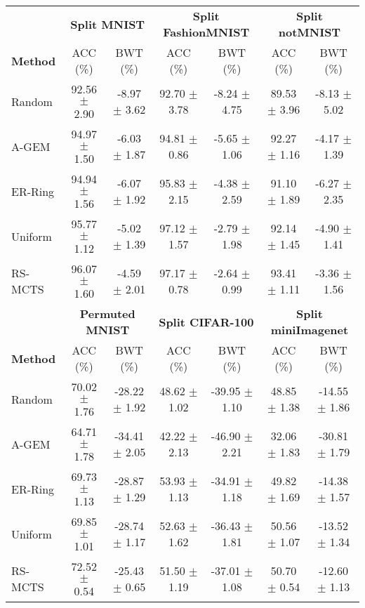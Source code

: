 \begin{tabular}{lcccccc}
	\toprule
	& \multicolumn{2}{c}{\textbf{Split MNIST}} & \multicolumn{2}{c}{\textbf{Split FashionMNIST}} & \multicolumn{2}{c}{\textbf{Split notMNIST}} \\ 
	\cmidrule(lr){2-3} \cmidrule(lr){4-5} \cmidrule(lr){6-7} 
	\textbf{Method} & ACC (\%)            & BWT (\%)           & ACC (\%)               & BWT (\%)               & ACC (\%)             & BWT (\%)             \\ \midrule
	Random          & 92.56 $\pm$ 2.90      & -8.97 $\pm$ 3.62     & 92.70 $\pm$ 3.78         & -8.24 $\pm$ 4.75         & 89.53 $\pm$ 3.96       & -8.13 $\pm$ 5.02       \\
	A-GEM           & 94.97 $\pm$ 1.50      & -6.03 $\pm$ 1.87     & 94.81 $\pm$ 0.86         & -5.65 $\pm$ 1.06         & 92.27 $\pm$ 1.16       & -4.17 $\pm$ 1.39       \\
	ER-Ring         & 94.94 $\pm$ 1.56      & -6.07 $\pm$ 1.92     & 95.83 $\pm$ 2.15         & -4.38 $\pm$ 2.59         & 91.10 $\pm$ 1.89       & -6.27 $\pm$ 2.35       \\
	Uniform      & 95.77 $\pm$ 1.12      & -5.02 $\pm$ 1.39     & 97.12 $\pm$ 1.57         & -2.79 $\pm$ 1.98         & 92.14 $\pm$ 1.45       & -4.90 $\pm$ 1.41       \\
	RS-MCTS            & 96.07 $\pm$ 1.60      & -4.59 $\pm$ 2.01     & 97.17 $\pm$ 0.78         & -2.64 $\pm$ 0.99         & 93.41 $\pm$ 1.11       & -3.36 $\pm$ 1.56      \\ \bottomrule \toprule
	& \multicolumn{2}{c}{\textbf{Permuted MNIST}} & \multicolumn{2}{c}{\textbf{Split CIFAR-100}} & \multicolumn{2}{c}{\textbf{Split miniImagenet}} \\ 
	\cmidrule(lr){2-3} \cmidrule(lr){4-5} \cmidrule(lr){6-7} 
	\textbf{Method} & ACC (\%)             & BWT (\%)             & ACC (\%)             & BWT (\%)              & ACC (\%)               & BWT (\%)               \\ \midrule
	Random          & 70.02 $\pm$ 1.76       & -28.22 $\pm$ 1.92      & 48.62 $\pm$ 1.02       & -39.95 $\pm$ 1.10       & 48.85 $\pm$ 1.38         & -14.55 $\pm$ 1.86        \\
	A-GEM           & 64.71 $\pm$ 1.78       & -34.41 $\pm$ 2.05      & 42.22 $\pm$ 2.13       & -46.90 $\pm$ 2.21       & 32.06 $\pm$ 1.83         & -30.81 $\pm$ 1.79        \\
	ER-Ring         & 69.73 $\pm$ 1.13       & -28.87 $\pm$ 1.29      & 53.93 $\pm$ 1.13       & -34.91 $\pm$ 1.18       & 49.82 $\pm$ 1.69         & -14.38 $\pm$ 1.57        \\
	Uniform      & 69.85 $\pm$ 1.01       & -28.74 $\pm$ 1.17      & 52.63 $\pm$ 1.62       & -36.43 $\pm$ 1.81       & 50.56 $\pm$ 1.07         & -13.52 $\pm$ 1.34        \\
	RS-MCTS            & 72.52 $\pm$ 0.54       & -25.43 $\pm$ 0.65      & 51.50 $\pm$ 1.19       & -37.01 $\pm$ 1.08       & 50.70 $\pm$ 0.54         & -12.60 $\pm$ 1.13       \\ \bottomrule
\end{tabular}